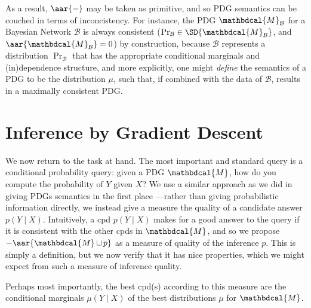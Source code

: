 \documentclass{article}
\theoremstyle{plain}
\theoremstyle{definition}
\theoremstyle{remark}
\newcommand{\dg}[1]{\mathbdcal{#1}}
\newcommand\smid{\!\mid\!}
\DeclareMathOperator{\bundle}{\sqcup}
\newcommand{\PDGof}[1]{{\dg M}_{#1}}
\begin{document}
As a result, $\aar{-}$  may be taken as primitive, and so PDG
semantics can be couched in terms of inconcistency. For instance, the
PDG $\PDGof{\mathcal B}$ for a Bayesian Network $\mathcal B$ is always
consistent ($\Pr_{\mathcal B} \in \SD{\PDGof{\mathcal B}}$, and $\aar{\PDGof{\mathcal B}} = 0$) 
by construction, because $\mathcal B$ represents a distribution 
$\Pr_{\mathcal B}$ that has the appropriate conditional marginals and
(in)dependence structure, and more explicitly, one might \emph{define}
the semantics of a PDG to be the distribution $\mu$, such that, if combined
with the data of $\mathcal B$, results in a maximally consistent PDG. 


\section{Inference by Gradient Descent}

We now return to the task at hand. 
The most important and standard query is a conditional probability
query: given a PDG $\dg M$, how do you compute the probability of $Y$ given $X$?
We use a similar approach as we did in giving PDGs semantics in the first place
---rather than giving probabilistic information directly, we instead give a
measure the quality of a candidate answer $p(Y\smid X)$.
Intuitively, a cpd $p(Y\smid X)$ makes for a good answer to the query
if it is consistent with the other cpds in $\dg M$, and so we propose
$-\aar{\dg M \bundle p}$ as a measure of quality of the inference $p$.
This is simply a definition, but we now verify that it has nice properties,
which we might expect from such a measure of inference quality. 

Perhaps most importantly, the best cpd(s) according to this measure
are the conditional marginals $\mu(Y\mid X)$ of the best distributions $\mu$ for $\dg M$.
\end{document}
